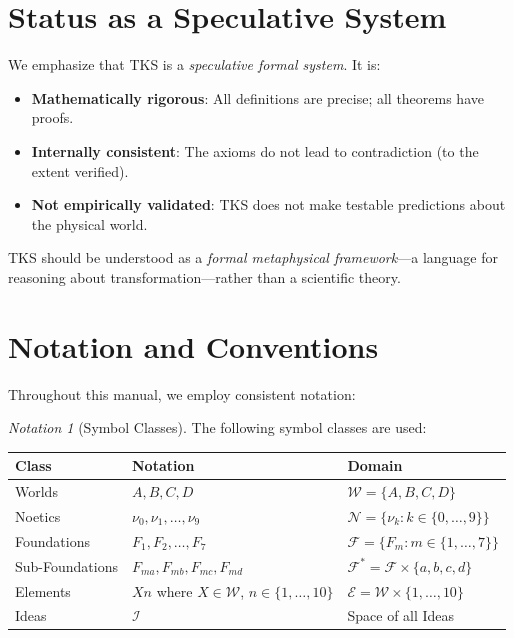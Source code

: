 \documentclass[11pt,twoside,openright]{book}
\theoremstyle{definition}
\theoremstyle{plain}
\theoremstyle{remark}
\newtheorem{notation}[definition]{Notation}
\newcommand{\Worlds}{\mathcal{W}}
\newcommand{\Ideas}{\mathcal{I}}
\newcommand{\Elements}{\mathcal{E}}
\newcommand{\Noetics}{\mathcal{N}}
\newcommand{\Foundations}{\mathcal{F}}
\newcommand{\noe}[1]{\nu_{#1}}
\begin{document}
\section{Status as a Speculative System}

We emphasize that TKS is a \emph{speculative formal system}. It is:

\begin{itemize}
  \item \textbf{Mathematically rigorous}: All definitions are precise; all theorems have proofs.
  \item \textbf{Internally consistent}: The axioms do not lead to contradiction (to the extent verified).
  \item \textbf{Not empirically validated}: TKS does not make testable predictions about the physical world.
\end{itemize}

TKS should be understood as a \emph{formal metaphysical framework}---a language for reasoning about transformation---rather than a scientific theory.

\section{Notation and Conventions}
\label{sec:notation}

Throughout this manual, we employ consistent notation:

\begin{notation}[Symbol Classes]
\label{not:symbols}
The following symbol classes are used:
\begin{center}
\begin{tabular}{lll}
\toprule
\textbf{Class} & \textbf{Notation} & \textbf{Domain} \\
\midrule
Worlds & $A, B, C, D$ & $\Worlds = \{A, B, C, D\}$ \\
Noetics & $\noe{0}, \noe{1}, \ldots, \noe{9}$ & $\Noetics = \{\noe{k} : k \in \{0,\ldots,9\}\}$ \\
Foundations & $F_1, F_2, \ldots, F_7$ & $\Foundations = \{F_m : m \in \{1,\ldots,7\}\}$ \\
Sub-Foundations & $F_{ma}, F_{mb}, F_{mc}, F_{md}$ & $\Foundations^* = \Foundations \times \{a,b,c,d\}$ \\
Elements & $Xn$ where $X \in \Worlds$, $n \in \{1,\ldots,10\}$ & $\Elements = \Worlds \times \{1,\ldots,10\}$ \\
Ideas & $\Ideas$ & Space of all Ideas \\
\bottomrule
\end{tabular}
\end{center}
\end{notation}
\end{document}
